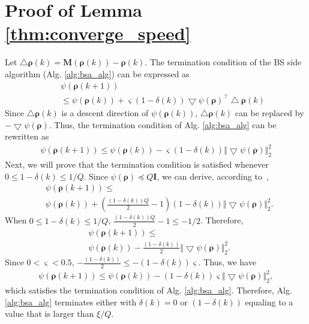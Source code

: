 \documentclass[journal]{IEEEtran}
\theoremstyle{definition}
\begin{document}
\appendices
\section{Proof of Lemma \ref{thm:converge_speed}}
\label{app:proof_converge_speed}
Let $\bigtriangleup \boldsymbol{\rho}(k)=\boldsymbol{M}(\boldsymbol{\rho}(k))-\boldsymbol{\rho}(k)$. The termination condition of the BS side algorithm (Alg. \ref{alg:bsa_alg}) can be expressed as
\begin{align}
\label{eq:termination_a}
&\psi(\boldsymbol{\rho}(k+1))\nonumber\\
\;\;\;&\leq \psi(\boldsymbol{\rho}(k))+
\varsigma(1-\delta(k))\bigtriangledown\psi(\boldsymbol{\rho})^{\top}\bigtriangleup \boldsymbol{\rho}(k)
\end{align}
Since $\bigtriangleup \boldsymbol{\rho}(k)$ is a descent direction of $\psi(\boldsymbol{\rho}(k))$, $\bigtriangleup \boldsymbol{\rho}(k)$ can be replaced by $-\bigtriangledown\psi(\boldsymbol{\rho})$. Thus, the termination condition of Alg. \ref{alg:bsa_alg} can be rewritten as
\begin{align}
\label{eq:termination_b}
\psi(\boldsymbol{\rho}(k+1))\leq \psi(\boldsymbol{\rho}(k))-\varsigma(1-\delta(k))\Vert\bigtriangledown\psi(\boldsymbol{\rho})\Vert^{2}_{2}
\end{align}
Next, we will prove that the termination condition is satisfied whenever $0\leq 1-\delta(k)\leq 1/Q$. Since $\psi(\boldsymbol{\rho})\preceq Q\boldsymbol{I}$, we can derive, according to~\cite{Boyd:2004:CVX},
\begin{align}
&\psi(\boldsymbol{\rho}(k+1))\leq \nonumber\\ &\psi(\boldsymbol{\rho}(k))+(\frac{(1-\delta(k))Q}{2}-1)(1-\delta(k))\Vert\bigtriangledown\psi(\boldsymbol{\rho})\Vert^{2}_{2}.
\end{align}
When $0\leq 1-\delta(k)\leq 1/Q$, $\frac{(1-\delta(k))Q}{2}-1 \leq -1/2$. Therefore,
\begin{align}
&\psi(\boldsymbol{\rho}(k+1))\leq \nonumber\\ &\psi(\boldsymbol{\rho}(k))-\frac{(1-\delta(k))}{2}\Vert\bigtriangledown\psi(\boldsymbol{\rho})\Vert^{2}_{2}.
\end{align}
Since $0<\varsigma<0.5$, $-\frac{(1-\delta(k))}{2}\leq -(1-\delta(k))\varsigma$. Thus, we have
\begin{align}
\psi(\boldsymbol{\rho}(k+1))\leq \psi(\boldsymbol{\rho}(k))-(1-\delta(k))\varsigma\Vert\bigtriangledown\psi(\boldsymbol{\rho})\Vert^{2}_{2},
\end{align}
which satisfies the termination condition of Alg. \ref{alg:bsa_alg}. Therefore, Alg. \ref{alg:bsa_alg} terminates either with $\delta(k)=0$ or $(1-\delta(k))$ equaling to a value that is larger than $\xi/Q$.
\end{document}
